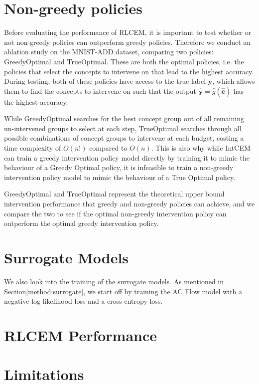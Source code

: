 \section{Non-greedy policies}

Before evaluating the performance of RLCEM, it is important to test whether or not 
non-greedy policies can outperform greedy policies. 
Therefore we conduct an
ablation study on the MNIST-ADD dataset, comparing two policies:
GreedyOptimal and TrueOptimal.
These are both the optimal policies,
i.e. the policies that select the concepts to intervene
on that lead to the highest accuracy. During 
testing, both of these policies have access to the true label $\mathbf{y}$, which 
allows them to find the concepts to intervene on 
such that the output
$\hat{\mathbf{y}} = \hat{g}(\hat{\mathbf{c}})$ 
has the highest accuracy.

While GreedyOptimal searches for the best concept group
out of all remaining un-intervened groups
to select at each step, TrueOptimal searches through
all possible combinations of concept groups to intervene at each budget, costing a time complexity of $O(n!)$ compared to
$O(n)$. This is also why while IntCEM can 
train a greedy intervention policy model directly
by training it to mimic the behaviour of a Greedy Optimal 
policy, it is infeasible to train a non-greedy intervention policy
model to mimic the behaviour of a True Optimal policy.

GreedyOptimal and TrueOptimal represent the theoretical
upper bound intervention performance
that greedy and non-greedy policies can achieve,
and we compare the two to see if the optimal 
non-greedy intervention policy can outperform the 
optimal greedy
intervention policy.


\section{Surrogate Models}

We also look into the training of the 
surrogate models.
As mentioned in Section\ref{method:surrogate}, 
we start off by training the AC Flow model
with a negative log likelihood loss and a cross
entropy loss. 



\section{RLCEM Performance}

\section{Limitations}

